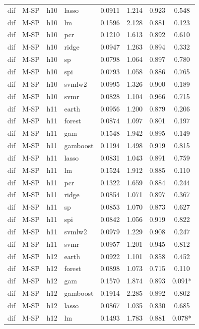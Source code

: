 \begin{ThreePartTable}
\begin{longtable}[t]{llclcccc}
dif & M-SP & h10 & lasso & 0.0911 & 1.214 & 0.923 & 0.548\\
dif & M-SP & h10 & lm & 0.1596 & 2.128 & 0.881 & 0.123\\
dif & M-SP & h10 & pcr & 0.1210 & 1.613 & 0.892 & 0.610\\
dif & M-SP & h10 & ridge & 0.0947 & 1.263 & 0.894 & 0.332\\
dif & M-SP & h10 & sp & 0.0798 & 1.064 & 0.897 & 0.780\\
dif & M-SP & h10 & spi & 0.0793 & 1.058 & 0.886 & 0.765\\
dif & M-SP & h10 & svmlw2 & 0.0995 & 1.326 & 0.900 & 0.189\\
dif & M-SP & h10 & svmr & 0.0828 & 1.104 & 0.966 & 0.715\\
\addlinespace
dif & M-SP & h11 & earth & 0.0956 & 1.200 & 0.879 & 0.206\\
dif & M-SP & h11 & forest & 0.0874 & 1.097 & 0.801 & 0.197\\
dif & M-SP & h11 & gam & 0.1548 & 1.942 & 0.895 & 0.149\\
dif & M-SP & h11 & gamboost & 0.1194 & 1.498 & 0.919 & 0.815\\
dif & M-SP & h11 & lasso & 0.0831 & 1.043 & 0.891 & 0.759\\
dif & M-SP & h11 & lm & 0.1524 & 1.912 & 0.885 & 0.110\\
dif & M-SP & h11 & pcr & 0.1322 & 1.659 & 0.884 & 0.244\\
dif & M-SP & h11 & ridge & 0.0854 & 1.071 & 0.897 & 0.367\\
dif & M-SP & h11 & sp & 0.0853 & 1.070 & 0.873 & 0.627\\
dif & M-SP & h11 & spi & 0.0842 & 1.056 & 0.919 & 0.822\\
dif & M-SP & h11 & svmlw2 & 0.0979 & 1.229 & 0.908 & 0.247\\
dif & M-SP & h11 & svmr & 0.0957 & 1.201 & 0.945 & 0.812\\
\addlinespace
dif & M-SP & h12 & earth & 0.0922 & 1.101 & 0.858 & 0.452\\
dif & M-SP & h12 & forest & 0.0898 & 1.073 & 0.715 & 0.110\\
dif & M-SP & h12 & gam & 0.1570 & 1.874 & 0.893 & 0.091*\\
dif & M-SP & h12 & gamboost & 0.1914 & 2.285 & 0.892 & 0.802\\
dif & M-SP & h12 & lasso & 0.0867 & 1.035 & 0.830 & 0.685\\
dif & M-SP & h12 & lm & 0.1493 & 1.783 & 0.881 & 0.078*\\

\end{longtable}
\end{ThreePartTable}
